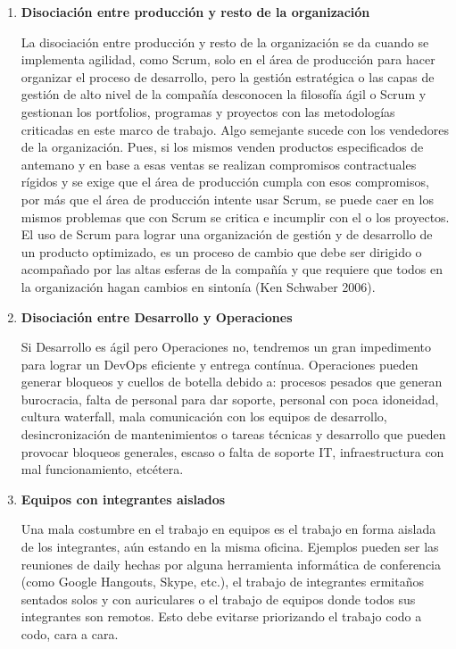 \begin{enumerate}
\item \textbf{Disociación entre producción y resto de la organización}

La disociación entre producción y resto de la organización se da cuando se implementa agilidad, como Scrum, solo en el área de producción para hacer organizar el proceso de desarrollo, pero la gestión estratégica o las capas de gestión de alto nivel de la compañía desconocen la filosofía ágil o Scrum y gestionan los portfolios, programas y proyectos con las metodologías criticadas en este marco de trabajo. Algo semejante sucede con los vendedores de la organización. Pues, si los mismos venden productos especificados de antemano y en base a esas ventas se realizan compromisos contractuales rígidos y se exige que el área de producción cumpla con esos compromisos, por más que el área de producción intente usar Scrum, se puede caer en los mismos problemas que con Scrum se critica e incumplir con el o los proyectos. El uso de Scrum para lograr una organización de gestión y de desarrollo de un producto optimizado, es un proceso de cambio que debe ser dirigido o acompañado por las altas esferas de la compañía y que requiere que todos en la organización hagan cambios en sintonía (Ken Schwaber 2006).

\item \textbf{Disociación entre Desarrollo y Operaciones}


Si Desarrollo es ágil pero Operaciones no, tendremos un gran impedimento para lograr un DevOps eficiente y entrega contínua. Operaciones pueden generar bloqueos y cuellos de botella debido a: procesos pesados que generan burocracia, falta de personal para dar soporte, personal con poca idoneidad, cultura waterfall, mala comunicación con los equipos de desarrollo, desincronización de mantenimientos o tareas técnicas y desarrollo que pueden provocar bloqueos generales, escaso o falta de soporte IT, infraestructura con mal funcionamiento, etcétera.

\item \textbf{Equipos con integrantes aislados}

Una mala costumbre en el trabajo en equipos es el trabajo en forma aislada de los integrantes, aún estando en la misma oficina. Ejemplos pueden ser las reuniones de daily hechas por alguna herramienta informática de conferencia (como Google Hangouts, Skype, etc.), el trabajo de integrantes ermitaños sentados solos y con auriculares o el trabajo de equipos donde todos sus integrantes son remotos. Esto debe evitarse priorizando el trabajo codo a codo, cara a cara.


\end{enumerate}
